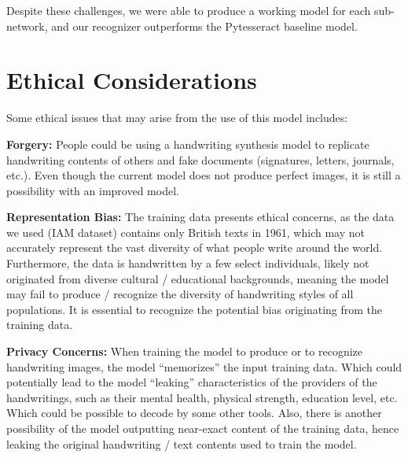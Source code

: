 \documentclass{article} %
\begin{document}
Despite these challenges, we were able to produce a working model for each sub-network, and our recognizer outperforms the Pytesseract baseline model.

\section{Ethical Considerations}
Some ethical issues that may arise from the use of this model includes:

{\bf Forgery:} People could be using a handwriting synthesis model to replicate handwriting contents of others and fake documents (signatures, letters, journals, etc.). Even though the current model does not produce perfect images, it is still a possibility with an improved model.

    {\bf Representation Bias:} The training data presents ethical concerns, as the data we used (IAM dataset) contains only British texts in 1961, which may not accurately represent the vast diversity of what people write around the world. Furthermore, the data is handwritten by a few select individuals, likely not originated from diverse cultural / educational backgrounds, meaning the model may fail to produce / recognize the diversity of handwriting styles of all populations. It is essential to recognize the potential bias originating from the training data.

    {\bf Privacy Concerns:} When training the model to produce or to recognize handwriting images, the model ``memorizes'' the input training data. Which could potentially lead to the model ``leaking'' characteristics of the providers of the handwritings, such as their mental health, physical strength, education level, etc. Which could be possible to decode by some other tools. Also, there is another possibility of the model outputting near-exact content of the training data, hence leaking the original handwriting / text contents used to train the model.

\label{last_page}
\clearpage



\end{document}
